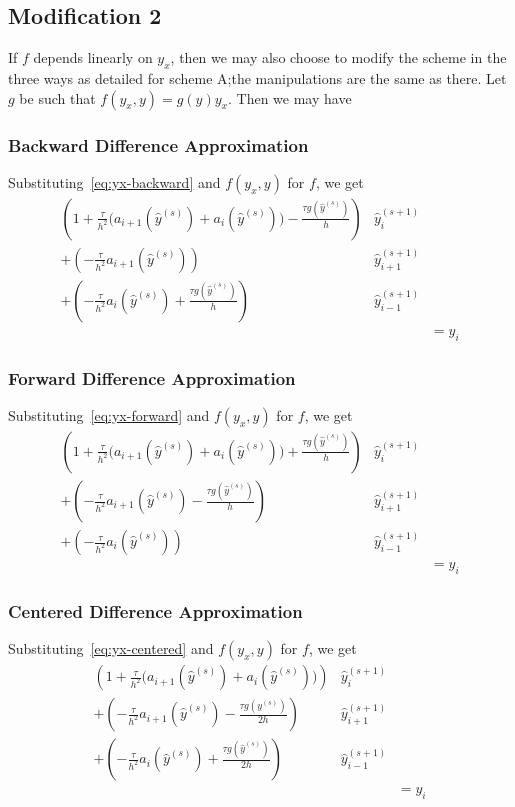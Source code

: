 \documentclass[12pt, reqno]{amsart}
\begin{document}
\subsection{Modification 2}
If $f$ depends linearly on $y_{x}$, then we may also choose to modify the scheme in the three ways as detailed for scheme A;\@ the manipulations are the same as there.
Let $g$ be such that $f(y_{x},y)=g(y)y_{x}$.
Then we may have
\subsubsection{Backward Difference Approximation}
Substituting~\eqref{eq:yx-backward} and $f(y_{x},y)$ for $f$, we get
\[
  \begin{aligned}
    \left(1+\frac{\tau}{h^{2}}\big(a_{i+1}(\hat{y}^{(s)})+
    a_{i}(\hat{y}^{(s)})\big)-\frac{\tau
      g(\hat{y}^{(s)})}{h}\right)
     & \hat{y}_{i}^{(s+1)}
    \\
    +\left(-\frac{\tau}{h^{2}}a_{i+1}(\hat{y}^{(s)})\right)
     & \hat{y}_{i+1}^{(s+1)}
    \\
    +\left(- \frac{\tau}{h^{2}}a_{i}(\hat{y}^{(s)})+\frac{\tau
      g(\hat{y}^{(s)})}{h}\right)
     & \hat{y}_{i-1}^{(s+1)}
    \\ &\qquad\qquad= y_{i}
  \end{aligned}
\]
\subsubsection{Forward Difference Approximation}
Substituting~\eqref{eq:yx-forward} and $f(y_{x},y)$ for $f$, we get
\[
  \begin{aligned}
    \left(1+\frac{\tau}{h^{2}}\big(a_{i+1}(\hat{y}^{(s)})+
    a_{i}(\hat{y}^{(s)})\big)+\frac{\tau
    g(\hat{y}^{(s)})}{h}\right) & \hat{y}_{i}^{(s+1)}
    \\
    +\left(-
    \frac{\tau}{h^{2}}a_{i+1}(\hat{y}^{(s)})-\frac{\tau
    g(\hat{y}^{(s)})}{h}\right) & \hat{y}_{i+1}^{(s+1)}
    \\
    +\left(-
    \frac{\tau}{h^{2}}a_{i}(\hat{y}^{(s)})\right)
                                & \hat{y}_{i-1}^{(s+1)}
    \\
                                & \qquad\qquad= y_{i}
  \end{aligned}
\]
\subsubsection{Centered Difference Approximation}
Substituting~\eqref{eq:yx-centered} and $f(y_{x},y)$ for $f$, we get
\begin{align*}
  \left(1+\frac{\tau}{h^{2}}\big(a_{i+1}(\hat{y}^{(s)})+ a_{i}(\hat{y}^{(s)})\big)\right)
   & \hat{y}_{i}^{(s+1)}
  \\
  +\left(- \frac{\tau}{h^{2}}a_{i+1}(\hat{y}^{(s)})-\frac{\tau g(y^{(s)})}{2h}\right)
   & \hat{y}_{i+1}^{(s+1)}
  \\
  +\left(- \frac{\tau}{h^{2}}a_{i}(\hat{y}^{(s)})+\frac{\tau g(\hat{y}^{(s)})}{2h}\right)
   & \hat{y}_{i-1}^{(s+1)}
  \\
   & \qquad\qquad = y_{i}
\end{align*}
\end{document}
